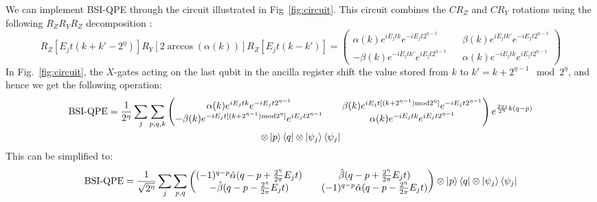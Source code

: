 \documentclass[aps,floatfix,10pt,amssymb,amsfont,amsmath,superscriptaddress,float,nofootinbib,longbibliography,nobalancelastpage,twocolumn]{revtex4-2}
\begin{document}
\begin{widetext}
We can implement BSI-QPE through the circuit illustrated in Fig~\ref{fig:circuit}. This circuit combines the  $CR_Z$ and $CR_Y$ rotations using the following $R_ZR_YR_Z$ decomposition \cite{Nielsen_Chuang_2010}: 
\begin{equation}
\label{eq:euler}
    R_Z[E_jt(k+k'-2^{\eta})]R_Y[2\arccos(\alpha(k))]R_Z[E_jt(k-k')] = \begin{pmatrix}
        \alpha(k)e^{iE_jtk}e^{-iE_jt2^{\eta-1}} && \beta(k)e^{iE_jt k'}e^{-iE_jt2^{\eta-1}}\\
        -\beta (k)e^{-iE_jt k'}e^{iE_jt2^{\eta-1}} && \alpha(k)e^{-iE_jtk}e^{iE_jt2^{\eta-1}}
    \end{pmatrix}
\end{equation}
In Fig.~\ref{fig:circuit}, the $X$-gates acting on the last qubit in the ancilla register shift the value stored from $k$ to $k'= k+2^{\eta-1} \mod 2^{\eta}$, and hence we get the following operation:
\begin{multline}
        \text{BSI-QPE} = \frac{1}{2^{\eta}}\sum_j\sum_{p,q,k} \begin{pmatrix}
        \alpha(k)e^{iE_jtk}e^{-iE_jt2^{\eta-1}} && \beta(k)e^{iE_jt[(k+2^{\eta-1})\text{mod} 2^{\eta}]}e^{-iE_jt2^{\eta-1}}\\
        -\beta (k)e^{-iE_jt[(k+2^{\eta-1})\text{mod} 2^{\eta}]}e^{iE_jt2^{\eta-1}} && \alpha(k)e^{-iE_jtk}e^{iE_jt2^{\eta-1}}
    \end{pmatrix}e^{\frac{2\pi i}{2^{\eta}}k(q-p)} \\\otimes\ket{p}\bra{q}\otimes\ket{\psi_j}\bra{\psi_j}
\end{multline}
This can be simplified to:
\begin{equation}
    \text{BSI-QPE} = \frac{1}{\sqrt{2^{\eta}}}\sum_j\sum_{p,q} \begin{pmatrix}
        (-1)^{q-p}\hat\alpha(q-p+\frac{2^{\eta}}{2\pi}E_jt) && \hat\beta(q-p+\frac{2^{\eta}}{2\pi}E_jt)\\
        -\hat\beta (q-p-\frac{2^{\eta}}{2\pi}E_jt) && (-1)^{q-p}\hat\alpha(q-p-\frac{2^{\eta}}{2\pi}E_jt)
    \end{pmatrix}\otimes\ket{p}\bra{q}\otimes\ket{\psi_j}\bra{\psi_j}
\end{equation}

\end{widetext}
\end{document}
